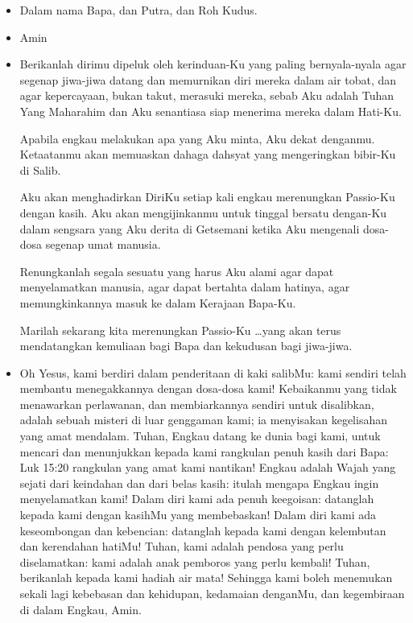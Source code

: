 \documentclass[a5paper,headsepline,titlepage,10pt,nnormalheadings,DIVcalc]{scrbook}
\newcommand{\BU}[1]{\begin{itemize} \item[U:] #1 \end{itemize}}
\newcommand{\BP}[1]{\begin{itemize} \item[P:] #1 \end{itemize}}
\begin{document}
\BP{Dalam nama Bapa, dan Putra, dan Roh Kudus. }
\BU{Amin}
 
\BP{Berikanlah dirimu dipeluk oleh kerinduan-Ku yang paling bernyala-nyala agar segenap jiwa-jiwa datang dan memurnikan diri mereka dalam air tobat, dan agar kepercayaan, bukan takut, merasuki mereka, sebab Aku adalah Tuhan Yang Maharahim dan Aku senantiasa siap menerima mereka dalam Hati-Ku.

Apabila engkau melakukan apa yang Aku minta, Aku dekat denganmu. Ketaatanmu akan memuaskan dahaga dahsyat yang mengeringkan bibir-Ku di Salib.

Aku akan menghadirkan DiriKu setiap kali engkau merenungkan Passio-Ku dengan kasih. Aku akan mengijinkanmu untuk tinggal bersatu dengan-Ku dalam sengsara yang Aku derita di Getsemani ketika Aku mengenali dosa-dosa segenap umat manusia.

Renungkanlah segala sesuatu yang harus Aku alami agar dapat menyelamatkan manusia, agar dapat bertahta dalam hatinya, agar memungkinkannya masuk ke dalam Kerajaan Bapa-Ku.

Marilah sekarang kita merenungkan Passio-Ku \dots yang akan terus mendatangkan kemuliaan bagi Bapa dan kekudusan bagi jiwa-jiwa.}

\BU{Oh Yesus, kami berdiri dalam penderitaan di kaki salibMu: kami sendiri telah membantu menegakkannya dengan dosa-dosa kami! Kebaikanmu yang tidak menawarkan perlawanan, dan membiarkannya sendiri untuk disalibkan, adalah sebuah misteri di luar genggaman kami; ia menyisakan kegelisahan yang amat mendalam. Tuhan, Engkau datang ke dunia bagi kami, untuk mencari dan menunjukkan kepada kami rangkulan penuh kasih dari Bapa:
 Luk 15:20 rangkulan yang amat kami nantikan! Engkau adalah Wajah yang sejati dari keindahan dan dari belas kasih: itulah mengapa Engkau ingin menyelamatkan kami! Dalam diri kami ada penuh keegoisan: datanglah kepada kami dengan kasihMu yang membebaskan! Dalam diri kami ada keseombongan dan kebencian: datanglah kepada kami dengan kelembutan dan kerendahan hatiMu! Tuhan, kami adalah pendosa yang perlu diselamatkan: kami adalah anak pemboros yang perlu kembali! Tuhan, berikanlah kepada kami hadiah air mata! Sehingga kami boleh menemukan sekali lagi kebebasan dan kehidupan, kedamaian denganMu, dan kegembiraan di dalam Engkau, Amin.} 

\end{document}
